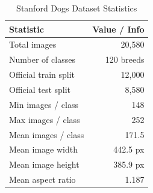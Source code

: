 \documentclass[twoside,final]{hcmut-report}
\begin{document}
\begin{center}
\end{center}

\begin{table}[H]
\centering
\caption{Stanford Dogs Dataset Statistics}
\begin{tabular}{lr}
\toprule
\textbf{Statistic} & \textbf{Value / Info} \\
\midrule
Total images & 20,580 \\
Number of classes & 120 breeds \\
Official train split & 12,000 \\
Official test split & 8,580 \\
Min images / class & 148 \\
Max images / class & 252 \\
Mean images / class & 171.5 \\
Mean image width & 442.5 px \\
Mean image height & 385.9 px \\
Mean aspect ratio & 1.187 \\
\bottomrule
\end{tabular}
\label{tab:stanford_dogs_stats}
\end{table}
\end{document}
